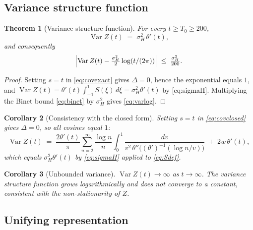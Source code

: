 \documentclass[11pt]{amsart}
\newtheorem{theorem}{Theorem}[section]
\newtheorem{corollary}[theorem]{Corollary}
\theoremstyle{definition}
\DeclareMathOperator{\Var}{Var}
\begin{document}
\subsection{Variance structure function}

\begin{theorem}[Variance structure function]\label{thm:var}
For every $t\ge T_{0}\ge 200$,
\begin{equation}\label{eq:varexact}
\Var Z(t) \;=\; \sigma_{H}^{2}\,\theta'(t),
\end{equation}
and consequently
\begin{equation}\label{eq:varlog}
\Bigl|\Var Z(t)-\tfrac{\sigma_{H}^{2}}{2}\log(t/(2\pi))\Bigr|\;\le\;\tfrac{\sigma_{H}^{2}}{200}.
\end{equation}
\end{theorem}

\begin{proof}
Setting $s=t$ in \eqref{eq:covexact} gives $\Delta=0$, hence the
exponential equals $1$, and
$\Var Z(t)=\theta'(t)\int_{-1}^{1}S(\xi)\,d\xi = \sigma_{H}^{2}\theta'(t)$
by \eqref{eq:sigmaH}. Multiplying the Binet bound \eqref{eq:binet} by
$\sigma_{H}^{2}$ gives \eqref{eq:varlog}.
\end{proof}

\begin{corollary}[Consistency with the closed form]\label{cor:varclosed}
Setting $s=t$ in \eqref{eq:covclosed} gives $\Delta=0$, so all cosines
equal $1$:
\begin{equation}\label{eq:vardiag}
\Var Z(t) \;=\; \frac{2\theta'(t)}{\pi}\sum_{n=2}^{\infty}\frac{\log n}{n}\!\int_{0}^{1}\!\!\frac{dv}{v^{2}\,\theta''\!\bigl((\theta')^{-1}(\log n/v)\bigr)} \;+\; 2w\,\theta'(t),
\end{equation}
which equals $\sigma_{H}^{2}\theta'(t)$ by \eqref{eq:sigmaH} applied to
\eqref{eq:Sdef}.
\end{corollary}

\begin{corollary}[Unbounded variance]
$\Var Z(t)\to\infty$ as $t\to\infty$. The variance structure function
grows logarithmically and does not converge to a constant, consistent
with the non-stationarity of $Z$.
\end{corollary}

\subsection{Unifying representation}
\end{document}
